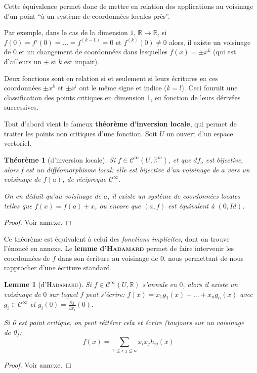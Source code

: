 \documentclass{article}
\newcommand{\cinf}{\mathcal{C}^\infty}
\newcommand{\R}{\mathbb{R}}
\newtheorem{thm}{Théorème}
\newtheorem{lemm}{Lemme}
\theoremstyle{definition}
\begin{document}
Cette équivalence permet donc de mettre en relation des applications au voisinage d'un point ``à un système de coordonnées locales près''.

Par exemple, dans le cas de la dimension $1$, $\R\to\R$, si $f(0)=f'(0)=...=f^{(k-1)}=0$ et $f^{(k)}(0)\neq 0$ alors, il existe un voisinage de 0 et un changement de coordonnées dans lesquelles $f(x)=\pm x^k$ (qui est d'ailleurs un $+$ si $k$ est impair).

Deux fonctions sont en relation si et seulement si leurs écritures en ces coordonnées $\pm x^k$ et $\pm x^l$ ont le même signe et indice ($k=l$). Ceci fournit une classification des points critiques en dimension 1, en fonction de leurs dérivées successives.

Tout d'abord vient le fameux \textbf{théorème d'inversion locale}, qui permet de traiter les points non critiques d'une fonction. Soit $U$ un ouvert d'un espace vectoriel.
\begin{thm}[d'inversion locale]
	Si $f\in\cinf(U,\R^m)$, et que $df_a$ est bijective, alors f est un difféomorphisme local: elle est bijective d'un voisinage de $a$ vers un voisinage de $f(a)$, de réciproque $\cinf$.

	On en déduit qu'au voisinage de $a$, il existe un système de coordonnées locales telles que $f(x)=f(a)+x$, ou encore que $(a,f)$ est équivalent à $(0,Id)$.
\end{thm}
\begin{proof} Voir annexe. \end{proof}

Ce théorème est équivalent à celui des \textit{fonctions implicites}, dont on trouve l'énoncé en annexe.
Le \textbf{lemme d'\textsc{Hadamard}} permet de faire intervenir les coordonnées de $f$ dans son écriture au voisinage de $0$, nous permettant de nous rapprocher d'une écriture standard.
\begin{lemm}[d'\textsc{Hadamard}]
	Si $f\in\cinf(U,\R)$ s'annule en $0$, alors il existe un voisinage de $0$ sur lequel $f$ peut s'écrire: $f(x)=x_1g_1(x)+...+x_ng_n(x)$ avec $g_i\in\cinf$ et $g_i(0) = \frac{\partial f}{\partial x_i}(0)$.

	Si 0 est point critique, on peut réitérer cela et écrire (toujours sur un voisinage de 0):
	$$f(x)=\sum_{1\leq i,j \leq n} x_ix_jh_{ij}(x)$$
\end{lemm}
\begin{proof} Voir annexe. \end{proof}
\end{document}
